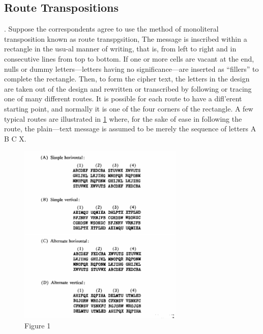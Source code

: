 \subsection{Route Transpositions}

\mypara. Suppose the correspondents agree to use the method of monoliteral
transposition known as route transpgsition, The message is inscribed 
within a rectangle in the usu-al manner of writing, that is, from left to
right and in consecutive lines from top to bottom. If one or more cells
are vacant at the end, nulls or dummy letters—letters having no significance—are inserted as “fillers” to complete the rectangle. Then, to form
the cipher text, the letters in the design are taken out of the design and
rewritten or transcribed by following or tracing one of many different
routes. It is possible for each route to have a diﬂ’erent starting point, and
normally it is one of the four corners of the rectangle. A few typical
routes are illustrated in \ref{fig:Figure 1} where, for the sake of ease in following
the route, the plain—text message is assumed to be merely the sequence
of letters A B C X.

\begin{figure}[h]
  \centering
    \includegraphics[width=0.7\textwidth,natwidth=598,natheight=663]{Chapter2_fig1.png}
    \caption{Figure 1}
    \label{fig:Figure 1}
\end{figure}

